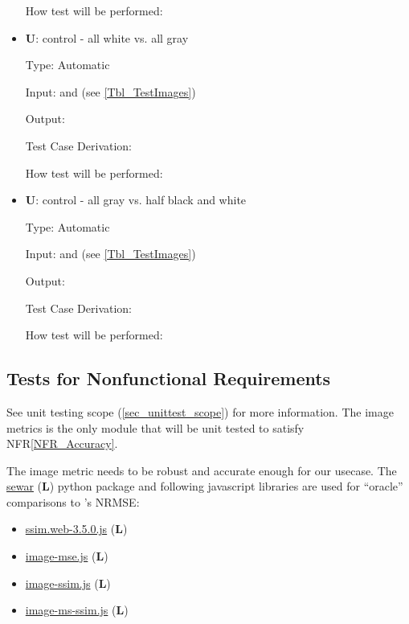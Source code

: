 \documentclass[12pt, titlepage]{article}
\newcommand{\nfrref}[1]{NFR\ref{#1}}
\newcounter{testnum} %
\newcounter{unittestnum} %
\newcounter{libnum} %
\begin{document}
\begin{itemize}
How test will be performed: 


\item{\textbf{U\theunittestnum \label{U_metric5}}: control - all white vs. all gray}

Type: Automatic

Input:  and  (see \ref{Tbl_TestImages})

Output: 

Test Case Derivation: 

How test will be performed: 


\item{\textbf{U\theunittestnum \label{U_metric6}}: control - all gray vs. half black and white}

Type: Automatic

Input:  and  (see \ref{Tbl_TestImages})

Output: 

Test Case Derivation: 

How test will be performed: 

    
\end{itemize}


\subsection{Tests for Nonfunctional Requirements}

See unit testing scope (\ref{sec_unittest_scope}) for more information.
The image metrics is the only module that will be unit tested to
satisfy \nfrref{NFR_Accuracy}.

The image metric needs to be robust and accurate enough for our usecase.
The \href{https://pypi.org/project/sewar}{sewar}
(\textbf{L\thelibnum \label{lib_sewar}})
python package 
and following javascript libraries are used for ``oracle'' comparisons
to \progname{}'s NRMSE:
\begin{itemize}
  \item \href{https://github.com/obartra/ssim}{ssim.web-3.5.0.js} (\textbf{L\thelibnum \label{lib_ssim}})
  \item \href{https://github.com/darosh/image-mse-js}{image-mse.js} (\textbf{L\thelibnum \label{lib_mse}})
  \item \href{https://github.com/darosh/image-ssim-js}{image-ssim.js} (\textbf{L\thelibnum \label{lib_ssim1}})
  \item \href{https://github.com/darosh/image-ms-ssim-js}{image-ms-ssim.js} (\textbf{L\thelibnum \label{lib_msssim}})
\end{itemize}
\end{document}
